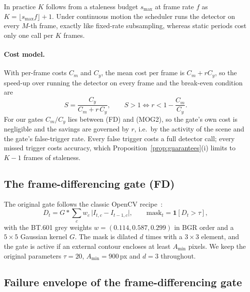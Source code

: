 \documentclass[12pt,a4paper]{article}
\theoremstyle{plain}
\theoremstyle{definition}
\newcommand{\FD}{FD}
\begin{document}
\noindent In practice $K$ follows from a staleness budget $s_{\max}$ at frame rate $f$ as $K=\lfloor s_{\max}f\rfloor+1$. Under continuous motion the scheduler runs the detector on every $M$-th frame, exactly like fixed-rate subsampling, whereas static periods cost only one call per $K$ frames.

\paragraph{Cost model.} With per-frame costs $C_m$ and $C_y$, the mean cost per frame is $C_m+rC_y$, so the speed-up over running the detector on every frame and the break-even condition are
\begin{equation}\label{eq:cost}
S=\frac{C_y}{C_m+r\,C_y},\qquad S>1\iff r<1-\frac{C_m}{C_y}.
\end{equation}
For our gates $C_m/C_y$ lies between \CostRatioFD{} (\FD) and \CostRatioMOG{} (MOG2), so the gate's own cost is negligible and the savings are governed by $r$, i.e.\ by the activity of the scene and the gate's false-trigger rate. Every false trigger costs a full detector call; every missed trigger costs accuracy, which Proposition~\ref{prop:guarantees}(i) limits to $K-1$ frames of staleness.

\subsection{The frame-differencing gate (\FD)}\label{sec:fd}
The original gate follows the classic OpenCV recipe~\cite{bradski2000opencv}:
\begin{equation}\label{eq:fd}
D_t=G*\sum_{c}w_c\,\bigl|I_{t,c}-I_{t-1,c}\bigr|,\qquad \text{mask}_t=\mathbf{1}[D_t>\tau],
\end{equation}
with the BT.601 grey weights $w=(0.114,0.587,0.299)$ in BGR order and a $5\times5$ Gaussian kernel $G$. The mask is dilated $d$ times with a $3\times3$ element, and the gate is active if an external contour encloses at least $A_{\min}$ pixels. We keep the original parameters $\tau=20$, $A_{\min}=900$\,px and $d=3$ throughout.

\subsection{Failure envelope of the frame-differencing gate}\label{sec:envelope}
\end{document}
